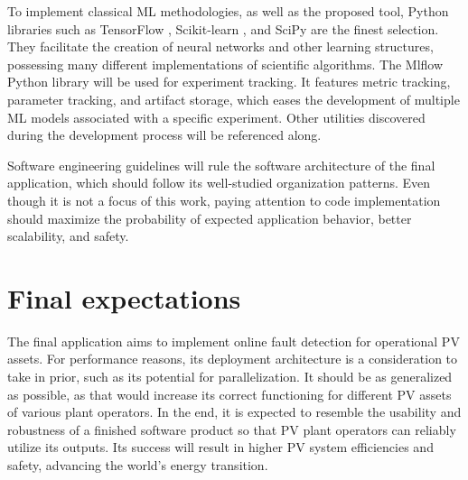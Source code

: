 To implement classical ML methodologies, as well as the proposed tool, Python libraries such as TensorFlow \cite{tensorflow}, Scikit-learn \cite{sklearn}, and SciPy \cite{scipy} are the finest selection. They facilitate the creation of neural networks and other learning structures, possessing many different implementations of scientific algorithms. The Mlflow \cite{mlflow} Python library will be used for experiment tracking. It features metric tracking, parameter tracking, and artifact storage, which eases the development of multiple ML models associated with a specific experiment. Other utilities discovered during the development process will be referenced along.

Software engineering guidelines will rule the software architecture of the final application, which should follow its well-studied organization patterns. Even though it is not a focus of this work, paying attention to code implementation should maximize the probability of expected application behavior, better scalability, and safety.


\section{Final expectations}

The final application aims to implement online fault detection for operational PV assets. For performance reasons, its deployment architecture is a consideration to take in prior, such as its potential for parallelization. It should be as generalized as possible, as that would increase its correct functioning for different PV assets of various plant operators. In the end, it is expected to resemble the usability and robustness of a finished software product so that PV plant operators can reliably utilize its outputs. Its success will result in higher PV system efficiencies and safety, advancing the world's energy transition.


